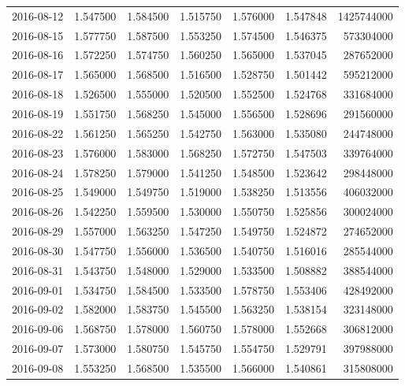 \begin{tabular}{lrrrrrr}
2016-08-12 &    1.547500 &    1.584500 &    1.515750 &    1.576000 &    1.547848 &  1425744000 \\
2016-08-15 &    1.577750 &    1.587500 &    1.553250 &    1.574500 &    1.546375 &   573304000 \\
2016-08-16 &    1.572250 &    1.574750 &    1.560250 &    1.565000 &    1.537045 &   287652000 \\
2016-08-17 &    1.565000 &    1.568500 &    1.516500 &    1.528750 &    1.501442 &   595212000 \\
2016-08-18 &    1.526500 &    1.555000 &    1.520500 &    1.552500 &    1.524768 &   331684000 \\
2016-08-19 &    1.551750 &    1.568250 &    1.545000 &    1.556500 &    1.528696 &   291560000 \\
2016-08-22 &    1.561250 &    1.565250 &    1.542750 &    1.563000 &    1.535080 &   244748000 \\
2016-08-23 &    1.576000 &    1.583000 &    1.568250 &    1.572750 &    1.547503 &   339764000 \\
2016-08-24 &    1.578250 &    1.579000 &    1.541250 &    1.548500 &    1.523642 &   298448000 \\
2016-08-25 &    1.549000 &    1.549750 &    1.519000 &    1.538250 &    1.513556 &   406032000 \\
2016-08-26 &    1.542250 &    1.559500 &    1.530000 &    1.550750 &    1.525856 &   300024000 \\
2016-08-29 &    1.557000 &    1.563250 &    1.547250 &    1.549750 &    1.524872 &   274652000 \\
2016-08-30 &    1.547750 &    1.556000 &    1.536500 &    1.540750 &    1.516016 &   285544000 \\
2016-08-31 &    1.543750 &    1.548000 &    1.529000 &    1.533500 &    1.508882 &   388544000 \\
2016-09-01 &    1.534750 &    1.584500 &    1.533500 &    1.578750 &    1.553406 &   428492000 \\
2016-09-02 &    1.582000 &    1.583750 &    1.545500 &    1.563250 &    1.538154 &   323148000 \\
2016-09-06 &    1.568750 &    1.578000 &    1.560750 &    1.578000 &    1.552668 &   306812000 \\
2016-09-07 &    1.573000 &    1.580750 &    1.545750 &    1.554750 &    1.529791 &   397988000 \\
2016-09-08 &    1.553250 &    1.568500 &    1.535500 &    1.566000 &    1.540861 &   315808000 \\

\end{tabular}
